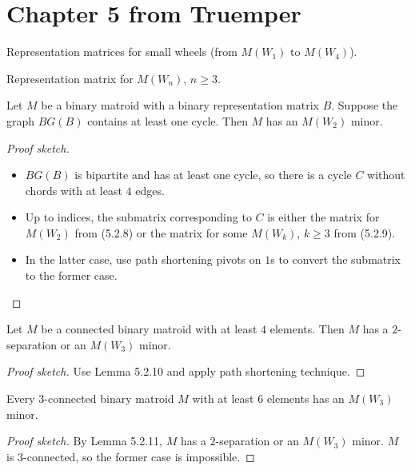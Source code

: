 \section{Chapter 5 from Truemper}

\begin{proposition}[5.2.8]
  \label{prop:5.2.8}
  Representation matrices for small wheels (from $M(W_{1})$ to $M(W_{4})$).
\end{proposition}

\begin{proposition}[5.2.9]
  \label{prop:5.2.9}
  Representation matrix for $M(W_{n})$, $n \geq 3$.
\end{proposition}

\begin{lemma}[5.2.10]
  \label{lem:5.2.10}
  Let $M$ be a binary matroid with a binary representation matrix $B$. Suppose the graph $BG(B)$ contains at least one cycle. Then $M$ has an $M(W_{2})$ minor.
\end{lemma}

\begin{proof}[Proof sketch]
  \begin{itemize}
    \item $BG(B)$ is bipartite and has at least one cycle, so there is a cycle $C$ without chords with at least $4$ edges.
    \item Up to indices, the submatrix corresponding to $C$ is either the matrix for $M(W_{2})$ from (5.2.8) or the matrix for some $M(W_{k})$, $k \geq 3$ from (5.2.9).
    \item In the latter case, use path shortening pivots on $1$s to convert the submatrix to the former case.
  \end{itemize}
\end{proof}

\begin{lemma}[5.2.11]
  \label{lem:5.2.11}
  Let $M$ be a connected binary matroid with at least $4$ elements. Then $M$ has a $2$-separation or an $M(W_3)$ minor.
\end{lemma}

\begin{proof}[Proof sketch]
  Use Lemma 5.2.10 and apply path shortening technique.
\end{proof}

\begin{corollary}[5.2.15]
  \label{cor:5.2.15}
  Every $3$-connected binary matroid $M$ with at least $6$ elements has an $M(W_3)$ minor.
\end{corollary}

\begin{proof}[Proof sketch]
  By Lemma 5.2.11, $M$ has a $2$-separation or an $M(W_{3})$ minor. $M$ is $3$-connected, so the former case is impossible.
\end{proof}
